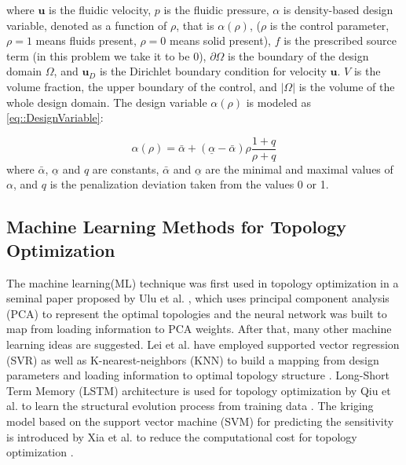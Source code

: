 \documentclass{article}
\begin{document}
where $\boldsymbol{u}$ is the fluidic velocity, $p$ is the fluidic pressure, $\alpha$ is density-based design variable, denoted as a function of  $\rho$, that is $\alpha(\rho)$,  ($\rho$ is the control parameter, $\rho = 1$ means fluids present, $\rho = 0$ means solid present), $f$ is the prescribed source term 
(in this problem we take it to be $0$),
$\partial \Omega$ is the boundary of the design domain $\Omega$, 
and $\boldsymbol{u}_D$
is the Dirichlet boundary condition for velocity $\boldsymbol{u}$. $V$ is the volume fraction, the upper boundary of the control, and $|\Omega|$ is the volume of the whole design domain.
The design variable $\alpha(\rho)$ is modeled as \eqref{eq::DesignVariable}:

\begin{equation}\label{eq::DesignVariable}
\alpha(\rho)=\bar{\alpha}+(\underline{\alpha}-\bar{\alpha}) \rho \frac{1+q}{\rho+q}
\end{equation}
where $\bar{\alpha}$, $\underline{\alpha}$ 
and $q$ are constants, $\bar{\alpha}$ and $\underline{\alpha}$ 
are the minimal and maximal values of $\alpha$, and $q$ is the penalization deviation taken from the values 0 or 1. 

\subsection{Machine Learning Methods for Topology Optimization}
The machine learning(ML) technique was first used in topology optimization in a seminal paper proposed by  Ulu et al. \cite{6-4-ulu2016data}, which uses principal component analysis (PCA) to represent the optimal topologies and the neural network was built to map from loading information to PCA weights. After that, many other machine learning ideas are suggested. Lei et al. have employed supported vector regression (SVR) as well as K-nearest-neighbors (KNN)  to build a mapping from design parameters and loading information to optimal topology structure \cite{6-3-lei2019machine}. Long-Short Term Memory (LSTM) architecture is used for topology optimization by Qiu et al. to learn the structural evolution process from training data \cite{6-18-qiu2021deep}. The kriging model based on the support vector machine (SVM) for predicting the sensitivity is introduced by Xia et al. to reduce the computational cost for topology optimization \cite{6-19-xia2017new}.
\end{document}
